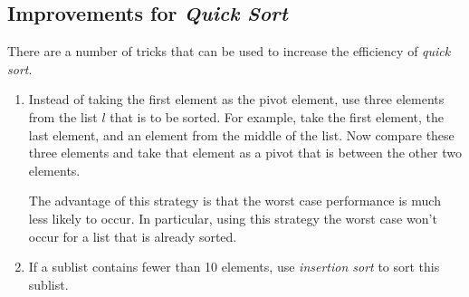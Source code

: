 \subsection{Improvements for \emph{Quick Sort}}
There are a number of tricks that can be used to increase the efficiency of \emph{quick sort}.
\begin{enumerate}
\item Instead of taking the first element as the pivot element, use three elements from the list
      $l$ that is to be sorted.  For example, take the first element, the last element, and an
      element from the middle of the list.  Now compare these three elements and take that element as
      a pivot that is between the other two elements.

      The advantage of this strategy is that the worst case performance is much less likely to occur.  In
      particular,  using this strategy the worst case won't occur for a list that is already
      sorted.
\item If a sublist contains fewer than 10 elements, use \emph{insertion sort} to sort this sublist.


\end{enumerate}
